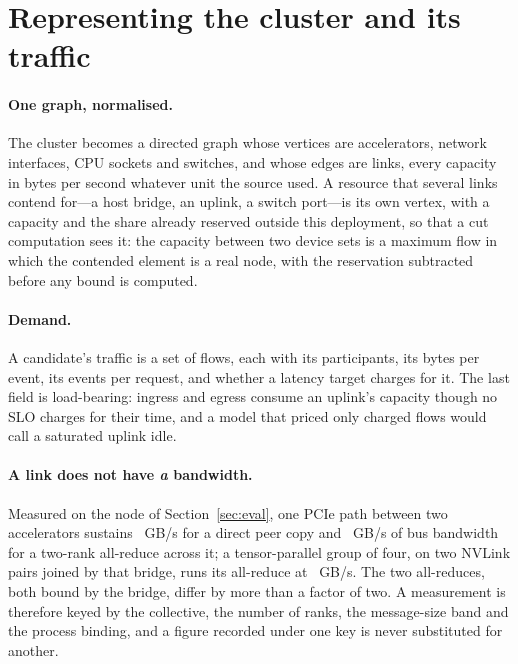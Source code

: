 \section{Representing the cluster and its traffic}
\label{sec:graph}

\paragraph{One graph, normalised.}
The cluster becomes a directed graph whose vertices are accelerators, network
interfaces, CPU sockets and switches, and whose edges are links, every capacity
in bytes per second whatever unit the source used. A resource that several
links contend for---a host bridge, an uplink, a switch port---is its own
vertex, with a capacity and the share already reserved outside this
deployment, so that a cut computation sees it: the capacity between two device
sets is a maximum flow in which the contended element is a real node, with the
reservation subtracted before any bound is computed.

\paragraph{Demand.}
A candidate's traffic is a set of flows, each with its participants, its bytes
per event, its events per request, and whether a latency target charges for it.
The last field is load-bearing: ingress and egress consume an uplink's capacity
though no SLO charges for their time, and a model that priced only charged
flows would call a saturated uplink idle.

\paragraph{A link does not have \emph{a} bandwidth.}
Measured on the node of Section~\ref{sec:eval}, one PCIe path between two
accelerators sustains \egfourPeerBridge~GB/s for a direct peer copy and
\egfourBusbwTwo~GB/s of bus bandwidth for a two-rank all-reduce across it; a
tensor-parallel group of four, on two NVLink pairs joined by that bridge, runs
its all-reduce at \egfourBusbwFour~GB/s. The two all-reduces, both bound by the
bridge, differ by more than a factor of two. A measurement is therefore keyed
by the collective, the number of ranks, the message-size band and the process
binding, and a figure recorded under one key is never substituted for another.

